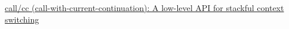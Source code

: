 \begin{thebibliography}{99}

        \href{http://www.open-std.org/jtc1/sc22/wg21/docs/papers/2017/p0534r0.pdf}
        {call/cc (call-with-current-continuation): A low-level API for stackful
        context switching}

\end{thebibliography}
